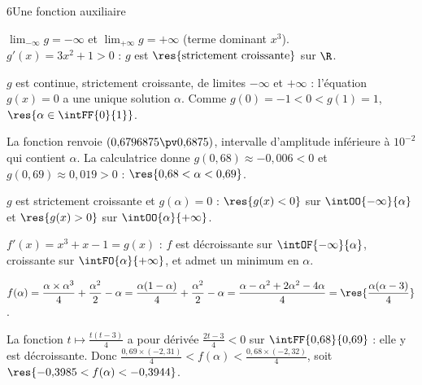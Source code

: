 \begin{corrige}{6}{Une fonction auxiliaire}
\begin{questions}
  \item $\lim_{-\infty}g=-\infty$ et $\lim_{+\infty}g=+\infty$ (terme dominant $x^{3}$).\\
    $g'(x)=3x^{2}+1>0$ : $g$ est $\res{\text{strictement croissante}}$ sur $\R$.
  \item $g$ est continue, strictement croissante, de limites $-\infty$ et $+\infty$ : l'équation $g(x)=0$ a une unique solution
    $\alpha$. Comme $g(0)=-1<0<g(1)=1$, $\res{\alpha\in\intFF{0}{1}}$.
  \item La fonction renvoie $(0{,}6796875\pv0{,}6875)$, intervalle d'amplitude inférieure à $10^{-2}$ qui contient $\alpha$.
    La calculatrice donne $g(0{,}68)\approx-0{,}006<0$ et $g(0{,}69)\approx0{,}019>0$ : $\res{0{,}68<\alpha<0{,}69}$.
  \item $g$ est strictement croissante et $g(\alpha)=0$ : $\res{g(x)<0}$ sur $\intOO{-\infty}{\alpha}$ et $\res{g(x)>0}$ sur $\intOO{\alpha}{+\infty}$.
\end{questions}
\begin{questions}[resume]
  \item $f'(x)=x^{3}+x-1=g(x)$ : $f$ est décroissante sur $\intOF{-\infty}{\alpha}$, croissante sur $\intFO{\alpha}{+\infty}$,
    et admet un minimum en $\alpha$.
  \item $f(\alpha)=\dfrac{\alpha\times\alpha^{3}}{4}+\dfrac{\alpha^{2}}{2}-\alpha=\dfrac{\alpha(1-\alpha)}{4}+\dfrac{\alpha^{2}}{2}-\alpha
    =\dfrac{\alpha-\alpha^{2}+2\alpha^{2}-4\alpha}{4}=\res{\dfrac{\alpha(\alpha-3)}{4}}$.
  \item La fonction $t\mapsto\frac{t(t-3)}{4}$ a pour dérivée $\frac{2t-3}{4}<0$ sur $\intFF{0{,}68}{0{,}69}$ : elle y est décroissante.
    Donc $\frac{0{,}69\times(-2{,}31)}{4}<f(\alpha)<\frac{0{,}68\times(-2{,}32)}{4}$, soit $\res{-0{,}3985<f(\alpha)<-0{,}3944}$.
\end{questions}
\end{corrige}

